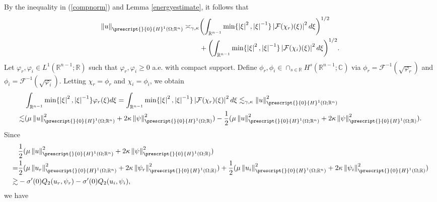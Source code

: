 \documentclass[11pt,letterpaper,reqno]{amsart}
\numberwithin{equation}{section}
\newcommand{\abs}[1]{\left\lvert#1\right\rvert}
\newcommand{\norm}[1]{\left\lVert#1\right\rVert}
\begin{document}
By the inequality in (\ref{compnorm})  and Lemma \ref{energyestimate}, it follows that
\begin{align}
    \norm{u}_{\prescript{}{0}{H}^{1}(\Omega;\mathbb{R}^{n})}\asymp_{\gamma,\kappa}& \biggl(\int_{\mathbb{R}^{n-1}}\min\{\abs{\xi}^{2},\abs{\xi}^{-1}\}\abs{\mathcal{F}(\chi_{r})(\xi)}^{2}d\xi\biggr)^{1/2} \nonumber \\
    &+\biggl(\int_{\mathbb{R}^{n-1}}\min\{\abs{\xi}^{2},\abs{\xi}^{-1}\}\abs{\mathcal{F}(\chi_{i})(\xi)}^{2}d\xi\biggr)^{1/2}.
\end{align}
Let \(\varphi_{r},\varphi_{i} \in L^{1}(\mathbb{R}^{n-1};\mathbb{R})\) such that \(\varphi_{r}, \varphi_{i} \geq 0\) a.e. with compact support. Define \(\phi_{r},\phi_{i} \in \cap_{s\in \mathbb{R}}H^{s}(\mathbb{R}^{n-1};\mathbb{C})\) via \(\phi_{r}=\mathcal{F}^{-1}(\sqrt{\varphi_{r}})\) and \(\phi_{i}=\mathcal{F}^{-1}(\sqrt{\varphi_{i}})\). Letting \(\chi_{r}=\phi_{r}\) and \(\chi_{i}=\phi_{i}\), we obtain
\begin{align}
    &\int_{\mathbb{R}^{n-1}}\min\{\abs{\xi}^{2},\abs{\xi}^{-1}\}\varphi_{r}(\xi)d\xi = \int_{\mathbb{R}^{n-1}}\min\{\abs{\xi}^{2},\abs{\xi}^{-1}\}\abs{\mathcal{F}(\chi_{r})(\xi)}^{2}d\xi\lesssim_{\gamma,\kappa} \norm{u}_{\prescript{}{0}{H}^{1}(\Omega;\mathbb{R}^{n})}^{2} \nonumber \\
    \lesssim&(\mu\norm{u}_{\prescript{}{0}{H}^{1}(\Omega;\mathbb{R}^{n})}^{2}+2\kappa\norm{\psi}_{\prescript{}{0}{H}^{1}(\Omega;\mathbb{R})}^{2})-\frac{1}{2}(\mu\norm{u}_{\prescript{}{0}{H}^{1}(\Omega;\mathbb{R}^{n})}^{2}+2\kappa\norm{\psi}_{\prescript{}{0}{H}^{1}(\Omega;\mathbb{R})}^{2}).
\end{align}
Since
\begin{align}
    &\frac{1}{2}(\mu\norm{u}_{\prescript{}{0}{H}^{1}(\Omega;\mathbb{R}^{n})}^{2}+2\kappa\norm{\psi}_{\prescript{}{0}{H}^{1}(\Omega;\mathbb{R})}^{2}) \nonumber\\
    =&\frac{1}{2}(\mu\norm{u_{r}}_{\prescript{}{0}{H}^{1}(\Omega;\mathbb{R}^{n})}^{2}+2\kappa\norm{\psi_{r}}_{\prescript{}{0}{H}^{1}(\Omega;\mathbb{R})}^{2})+\frac{1}{2}(\mu\norm{u_{i}}_{\prescript{}{0}{H}^{1}(\Omega;\mathbb{R}^{n})}^{2}+2\kappa\norm{\psi_{i}}_{\prescript{}{0}{H}^{1}(\Omega;\mathbb{R})}^{2}) \nonumber \\
    \gtrsim&-\sigma'(0)Q_{2}(u_{r},\psi_{r})-\sigma'(0)Q_{2}(u_{i},\psi_{i}),
\end{align}
we have
\end{document}
